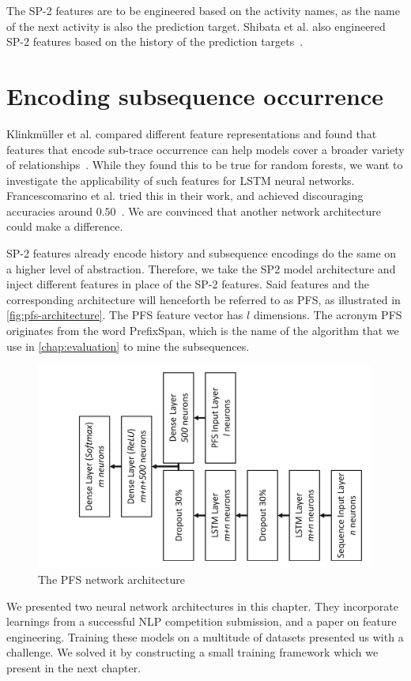 \noindent The SP-2 features are to be engineered based on the activity names, as the name of the next activity is also the prediction target.
Shibata et al. also engineered SP-2 features based on the history of the prediction targets~\cite{shibata2016bipartite}.

\section{Encoding subsequence occurrence}\label{sec:contrib:pfs-inspiration}
Klinkmüller et al. compared different feature representations and found that features that encode sub-trace occurrence can help models cover a broader variety of relationships~\cite{klinkmuller2018reliablemonitoring}.
While they found this to be true for random forests, we want to investigate the applicability of such features for LSTM neural networks.
Francescomarino et al. tried this in their work, and achieved discouraging accuracies around $0.50$~\cite{francescomarino2017}.
We are convinced that another network architecture could make a difference.

SP-2 features already encode history and subsequence encodings do the same on a higher level of abstraction.
Therefore, we take the SP2 model architecture and inject different features in place of the SP-2 features.
Said features and the corresponding architecture will henceforth be referred to as PFS, as illustrated in \autoref{fig:pfs-architecture}. The PFS feature vector has $l$ dimensions.
The acronym PFS originates from the word PrefixSpan, which is the name of the algorithm that we use in \autoref{chap:evaluation} to mine the subsequences.

\begin{figure}[ht]
    \centering
    \includegraphics[width=.8\textwidth,angle=-90,origin=c]{gfx/pfs-network-architecture.pdf}
    \caption{The PFS network architecture}
    \label{fig:pfs-architecture}
\end{figure}

We presented two neural network architectures in this chapter. They incorporate
learnings from a successful NLP competition submission, and a paper on feature engineering.
Training these models on a multitude of datasets presented us with a challenge.
We solved it by constructing a small training framework which we present in the next chapter.

